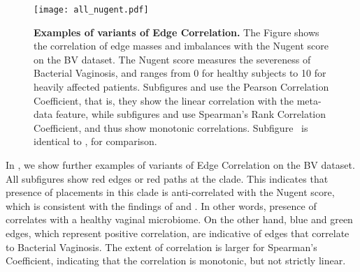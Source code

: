 %
%


\begin{figure}[!hpbt]
    \centering
    \texttt{[image: all\_nugent.pdf]}
    \begin{subfigure}{0pt}
        \label{fig:all_nugent:sub:pcc_em}
    \end{subfigure}
    \begin{subfigure}{0pt}
        \label{fig:all_nugent:sub:pcc_ei}
    \end{subfigure}
    \begin{subfigure}{0pt}
        \label{fig:all_nugent:sub:srcc_em}
    \end{subfigure}
    \begin{subfigure}{0pt}
        \label{fig:all_nugent:sub:srcc_ei}
    \end{subfigure}
    \caption[Examples of variants of Edge Correlation]{
        \textbf{Examples of variants of Edge Correlation.}
        The Figure shows the correlation of edge masses and imbalances with the Nugent score on the \ac{BV} dataset.
        The Nugent score measures the severeness of Bacterial Vaginosis,
        and ranges from \num{0} for healthy subjects to \num{10} for heavily affected patients.
        Subfigures  and  use the
        Pearson Correlation Coefficient, that is, they show the linear correlation with the meta-data feature,
        while subfigures  and  use
        Spearman's Rank Correlation Coefficient, and thus show monotonic correlations.
        Subfigure~ is identical to , for comparison.
    }
    \label{fig:all_nugent}
\end{figure}

In , we show further examples of variants of Edge Correlation on the \ac{BV} dataset.
All subfigures show red edges or red paths at the  clade.
This indicates that presence of placements in this clade is anti-correlated with the Nugent score,
which is consistent with the findings of \cite{Srinivasan2012} and \cite{Matsen2011a}.
In other words, presence of  correlates with a healthy vaginal microbiome.
On the other hand, blue and green edges, which represent positive correlation,
are indicative of edges that correlate to Bacterial Vaginosis.
The extent of correlation is larger for Spearman's Coefficient,
indicating that the correlation is monotonic, but not strictly linear.

